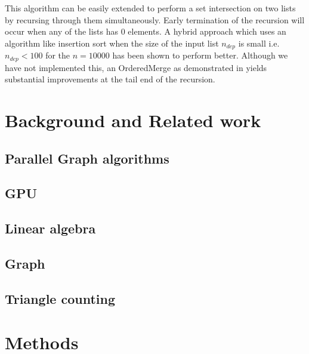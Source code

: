 \documentclass[conference]{IEEEtran}
\begin{document}
This algorithm can be easily extended to perform a set intersection on two lists by recursing through them simultaneously.  Early termination of the recursion will occur when any of the lists has 0 elements. A hybrid approach which uses an algorithm like insertion sort when the size of the input list $n_{dep}$ is small i.e. $n_{dep}<100$ for the $n=10000$ has been shown to perform better\cite{b16}. Although we have not implemented this, an OrderedMerge as demonstrated in \cite{b18, b17} yields substantial improvements at the tail end of the recursion.

\section{Background and Related work}
\subsection{Parallel Graph algorithms}
\subsection{GPU}
\subsection{Linear algebra}
\subsection{Graph}
\subsection{Triangle counting}

\section{Methods}
\end{document}
